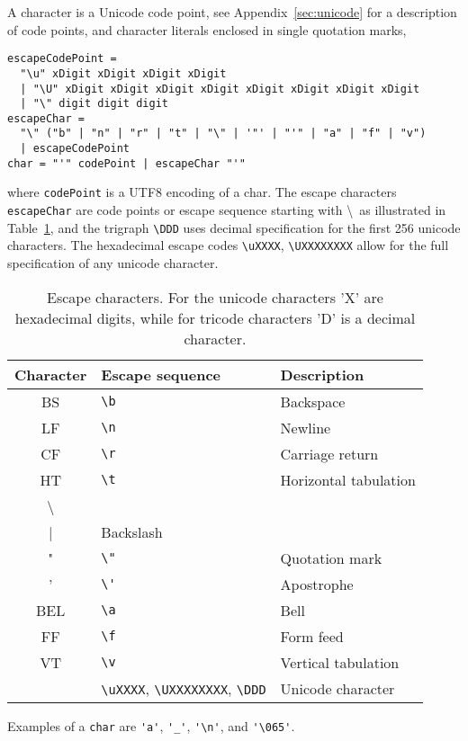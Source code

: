 A character is a Unicode code point, see Appendix~\ref{sec:unicode} for a description of code points, and character literals enclosed in single quotation marks,
%
\begin{lstlisting}[language=EBNF]
escapeCodePoint = 
  "\u" xDigit xDigit xDigit xDigit
  | "\U" xDigit xDigit xDigit xDigit xDigit xDigit xDigit xDigit
  | "\" digit digit digit 
escapeChar = 
  "\" ("b" | "n" | "r" | "t" | "\" | '"' | "'" | "a" | "f" | "v")
  | escapeCodePoint
char = "'" codePoint | escapeChar "'"
\end{lstlisting}
% 
where \lstinline[language=EBNF]!codePoint! is a UTF8 encoding of a char. The escape characters \lstinline[language=EBNF]{escapeChar} are code points or escape sequence starting with \textbackslash\ as illustrated in Table~\ref{tab:escapeChar}, and the trigraph \lstinline|\DDD| uses decimal specification for the first 256 unicode characters. The hexadecimal escape codes \lstinline|\uXXXX|, \lstinline|\UXXXXXXXX| allow for the full specification of any unicode character.
\begin{table}
  \centering
  \begin{tabular}{|c|l|l|}
    \hline
    Character& Escape sequence & Description\\
    \hline
    BS &\lstinline|\b|& Backspace\\
    LF &\lstinline|\n|&Newline\\
    CF &\lstinline|\r|&Carriage return\\
    HT &\lstinline|\t|&Horizontal tabulation\\
    \textbackslash &\lstinline|\\|&Backslash\\
     " &\lstinline|\"|&Quotation mark\\
    ' &\lstinline|\'|&Apostrophe\\
    BEL&\lstinline|\a|& Bell\\
    FF&\lstinline|\f|&Form feed\\
    VT &\lstinline|\v|&Vertical tabulation\\
    &\lstinline|\uXXXX|, \lstinline|\UXXXXXXXX|, \lstinline|\DDD|&Unicode character\\
    \hline
  \end{tabular}
  \caption{Escape characters. For the unicode characters 'X' are hexadecimal digits, while for tricode characters 'D' is a decimal character.}
  \label{tab:escapeChar}
\end{table}
Examples of a \lstinline[language=ebnf]!char! are \lstinline{'a'}, \lstinline{'_'}, \lstinline{'\n'}, and \lstinline{'\065'}.

